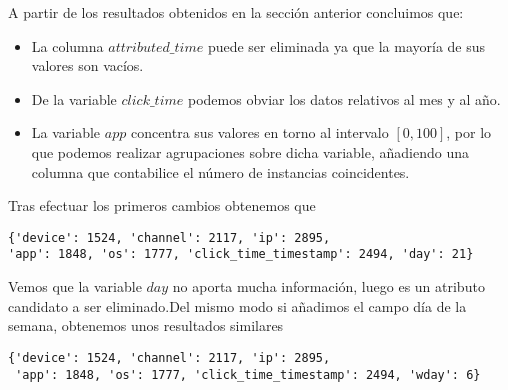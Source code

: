 A partir de los resultados obtenidos en la sección anterior concluimos que:
\begin{itemize}
	\item La columna $attributed\_time$ puede ser eliminada ya que la mayoría de sus valores son vacíos.
	\item De la variable $click\_time$ podemos obviar los datos relativos al mes y al año.
	\item La variable $app$ concentra sus valores en torno al intervalo $[0,100]$, por lo que podemos realizar agrupaciones sobre dicha variable, añadiendo una columna que contabilice el número de instancias coincidentes.
\end{itemize}
Tras efectuar los primeros cambios obtenemos que
\begin{verbatim}
{'device': 1524, 'channel': 2117, 'ip': 2895,
'app': 1848, 'os': 1777, 'click_time_timestamp': 2494, 'day': 21}
\end{verbatim}
Vemos que la variable $day$ no aporta mucha información, luego es un atributo candidato a ser eliminado.Del mismo modo si añadimos el campo día de la semana, obtenemos unos resultados similares
\begin{verbatim}
{'device': 1524, 'channel': 2117, 'ip': 2895,
 'app': 1848, 'os': 1777, 'click_time_timestamp': 2494, 'wday': 6}
\end{verbatim}

